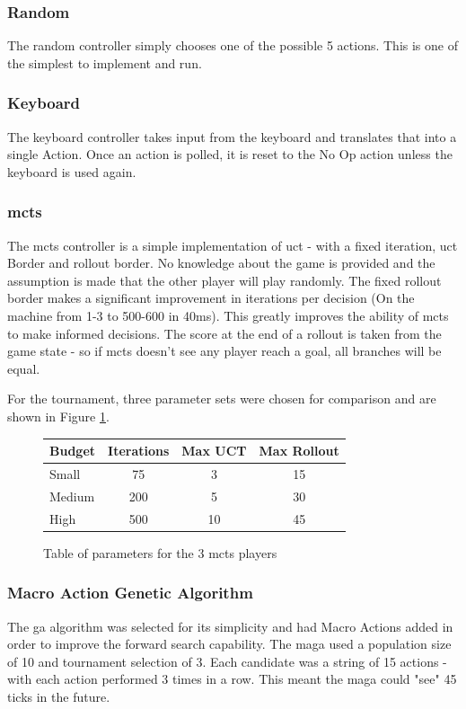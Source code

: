 \documentclass{IEEEtran}
\begin{document}
\subsubsection*{Random}
The random controller simply chooses one of the possible 5 actions. This is one of the simplest to implement and run.
\subsubsection*{Keyboard}
The keyboard controller takes input from the keyboard and translates that into a single Action. Once an action is polled, it is reset to the No Op action unless the keyboard is used again. 
\subsubsection*{\gls{mcts}}
The \gls{mcts} controller is a simple implementation of \gls{uct} - with a fixed iteration, \gls{uct} Border and rollout border. No knowledge about the game is provided and the assumption is made that the other player will play randomly. The fixed rollout border makes a significant improvement in iterations per decision (On the machine from 1-3 to 500-600 in 40ms). This greatly improves the ability of \gls{mcts} to make informed decisions. The score at the end of a rollout is taken from the game state - so if \gls{mcts} doesn't see any player reach a goal, all branches will be equal.

For the tournament, three parameter sets were chosen for comparison and are shown in Figure \ref{mctsTable}.
\begin{figure}[h]
\centering
\begin{tabular}{| l | c | c | c |}
\hline
\textbf{Budget} & \textbf{Iterations} & \textbf{Max UCT} & \textbf{Max Rollout} \\
\hline
Small & 75 & 3 & 15 \\
Medium & 200 & 5 & 30 \\
High & 500 & 10 & 45 \\
\hline
\end{tabular}
\caption{Table of parameters for the 3 \gls{mcts} players}
\label{mctsTable}
\end{figure}

\subsubsection*{Macro Action Genetic Algorithm}
The \gls{ga} algorithm was selected for its simplicity and had Macro Actions added in order to improve the forward search capability. The \gls{maga} used a population size of 10 and tournament selection of 3. Each candidate was a string of 15 actions - with each action performed 3 times in a row. This meant the \gls{maga} could "see" 45 ticks in the future.
\end{document}
